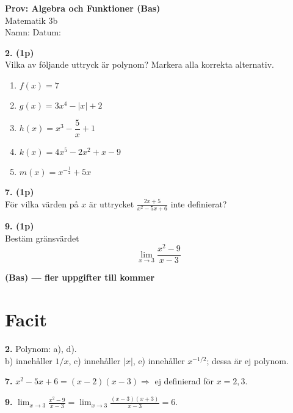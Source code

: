 \documentclass[12pt]{article}
\begin{document}
\begin{center}
\Large\textbf{Prov: Algebra och Funktioner (Bas)} \\
\large Matematik 3b \\[0.5cm]
\normalsize
Namn: \underline{\hspace{6cm}} \quad Datum: \underline{\hspace{3cm}}
\end{center}
\vspace{0.5cm}


\noindent
    \textbf{2. (1p)} \\
    Vilka av följande uttryck är polynom? Markera alla korrekta alternativ.
    \begin{enumerate}[label=$\square$ \alph*)]
        \item $f(x) = 7$
        \item $g(x) = 3x^4 - \lvert x \rvert + 2$
        \item $h(x) = x^3 - \dfrac{5}{x} + 1$
        \item $k(x) = 4x^5 - 2x^2 + x - 9$
        \item $m(x) = x^{-\tfrac{1}{2}} + 5x$
    \end{enumerate}


    \noindent
    \textbf{7. (1p)} \\
    För vilka värden på $x$ är uttrycket $\displaystyle \frac{2x + 5}{x^2 - 5x + 6}$ inte definierat?
    
        \vspace{0.75cm}
        
        \noindent
        \textbf{9. (1p)} \\
        Bestäm gränsvärdet
        \[
         \lim_{x \to 3} \frac{x^2 - 9}{x - 3}
        \]
        
            \vspace{1cm}
            
            \begin{center}
        \textbf{(Bas) — fler uppgifter till kommer}
            \end{center}
            
            \newpage
            \section*{Facit}
            
            \noindent\textbf{2.} Polynom: a), d).\\
            b) innehåller $1/x$, c) innehåller $|x|$, e) innehåller $x^{-1/2}$; dessa är ej polynom.
            
            \vspace{0.5cm}
            \noindent\textbf{7.} $x^2-5x+6 = (x-2)(x-3) \Rightarrow$ ej definierad för $x=2,3$.
            
            \vspace{0.5cm}
            \noindent\textbf{9.} $\displaystyle \lim_{x\to 3}\frac{x^2-9}{x-3} = \lim_{x\to 3}\frac{(x-3)(x+3)}{x-3} = 6$.
            
            
\end{document}
